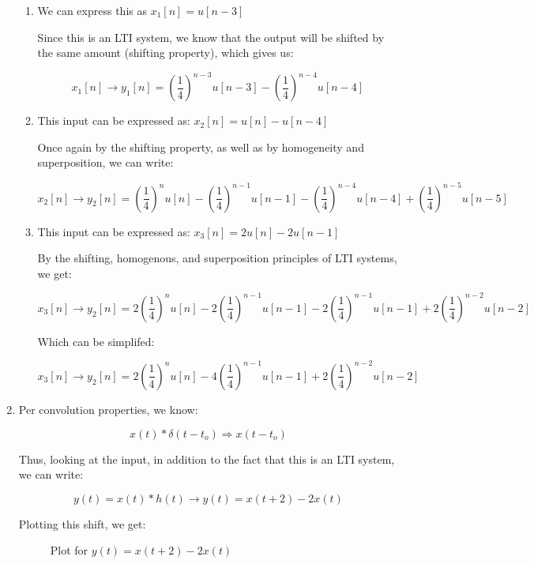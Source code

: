 \begin{enumerate}
    \begin{enumerate}

      \item We can express this as $x_1[n]=u[n-3]$

        Since this is an LTI system, we know that the output will be shifted by the same amount (shifting property), which gives us:

        $$\boxed{x_1[n]\to y_1[n]=\left( \frac{1}{4} \right)^{n-3}u[n-3]-\left( \frac{1}{4} \right)^{n-4}u[n-4]}$$

      \item This input can be expressed as: $x_2[n]=u[n]-u[n-4]$

        Once again by the shifting property, as well as by homogeneity and superposition, we can write:

        $$\boxed{x_2[n]\to y_2[n]=\left( \frac{1}{4} \right)^{n}u[n]-\left( \frac{1}{4} \right)^{n-1}u[n-1]-\left( \frac{1}{4} \right)^{n-4}u[n-4]+\left( \frac{1}{4} \right)^{n-5}u[n-5]}$$

      \item This input can be expressed as: $x_3[n]=2u[n]-2u[n-1]$

        By the shifting, homogenous, and superposition principles of LTI systems, we get:

        $$x_3[n]\to y_2[n]=2\left( \frac{1}{4} \right)^{n}u[n]-2\left( \frac{1}{4} \right)^{n-1}u[n-1]-2\left( \frac{1}{4} \right)^{n-1}u[n-1]+2\left( \frac{1}{4} \right)^{n-2}u[n-2]$$

        Which can be simplifed:

        $$\boxed{x_3[n]\to y_2[n]=2\left( \frac{1}{4} \right)^{n}u[n]-4\left( \frac{1}{4} \right)^{n-1}u[n-1]+2\left( \frac{1}{4} \right)^{n-2}u[n-2]}$$

    \end{enumerate}

  \item

    Per convolution properties, we know:

    $$x(t)*\delta(t-t_o)\Rightarrow x(t-t_o)$$

    Thus, looking at the input, in addition to the fact that this is an LTI system, we can write:

    $$\boxed{y(t)=x(t)*h(t)\to y(t)=x(t+2)-2x(t)}$$

    Plotting this shift, we get:

    \begin{figure}[H]
      \centering
      
      \caption{Plot for $y(t)=x(t+2)-2x(t)$}
      \label{fig:2}
    \end{figure}


\end{enumerate}
